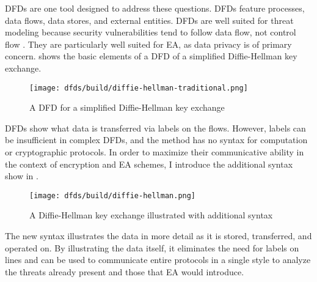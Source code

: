 \Acp{DFD} are one tool designed to address these questions. \Acp{DFD} feature processes, data flows, data stores, and
external entities. \Acp{DFD} are well suited for threat modeling because security vulnerabilities tend to follow data
flow, not control flow \cite{shostack_threat_2014}. They are particularly well suited for \ac{EA}, as data privacy is of
primary concern.  shows the basic elements of a \ac{DFD} of a simplified Diffie-Hellman
key exchange.

\begin{figure}[p]
    \centering\CaptionFontSize
    \texttt{[image: dfds/build/diffie-hellman-traditional.png]}
    \caption{A \acf{DFD} for a simplified Diffie-Hellman key exchange}
    \label{fig-dfd-dh-traditional}
\end{figure}

\Acp{DFD} show what data is transferred via labels on the flows. However, labels can be insufficient in complex
\acp{DFD}, and the method has no syntax for computation or cryptographic protocols. In order to maximize their
communicative ability in the context of encryption and \acl{EA} schemes, I introduce the additional syntax show in
.

\begin{figure}[p]
    \centering\CaptionFontSize
    \texttt{[image: dfds/build/diffie-hellman.png]}
    \caption{A Diffie-Hellman key exchange illustrated with additional syntax}
    \label{fig-dfd-dh-updated}
\end{figure}

The new syntax illustrates the data in more detail as it is stored, transferred, and operated on. By illustrating the
data itself, it eliminates the need for labels on lines and can be used to communicate entire protocols in a single
style to analyze the threats already present and those that \ac{EA} would introduce.


